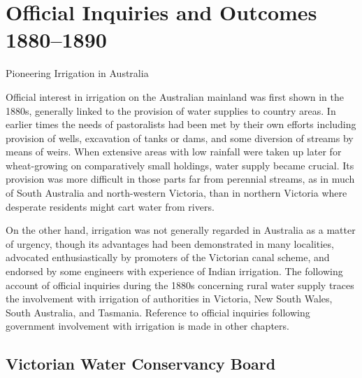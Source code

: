 
\setcounter{endnote}{0}

\chapter{Official Inquiries and Outcomes 1880--1890}
\label{ch:inquiries}
%
{Pioneering Irrigation in Australia}

Official interest in irrigation on the Australian mainland was first
sh\-own in the 1880s, generally linked to the provision of water
supplies to country areas.  In earlier times the needs of pastoralists
had been met by their own efforts including provision of wells,
excavation of tanks or dams, and some diversion of streams by means of
weirs.  When extensive areas with low rainfall were taken up later for
wheat-growing on comparatively small holdings, water supply became
crucial.  Its provision was more difficult in those parts far from
perennial streams, as in much of South Australia and north-western
Victoria, than in northern Victoria where desperate residents might
cart water from rivers.

On the other hand, irrigation was not generally regarded in Australia
as a matter of urgency, though its advantages had been demonstrated in
many localities, advocated enthusiastically by promoters of the
Victorian canal scheme, and endorsed by some engineers with experience
of Indian irrigation.  The following account of official inquiries
during the 1880s concerning rural water supply traces the involvement
with irrigation of authorities in Victoria, New South Wales, South
Australia, and Tasmania.  Reference to official inquiries following
government involvement with irrigation is made in other chapters.

\section*{Victorian Water Conservancy Board}

